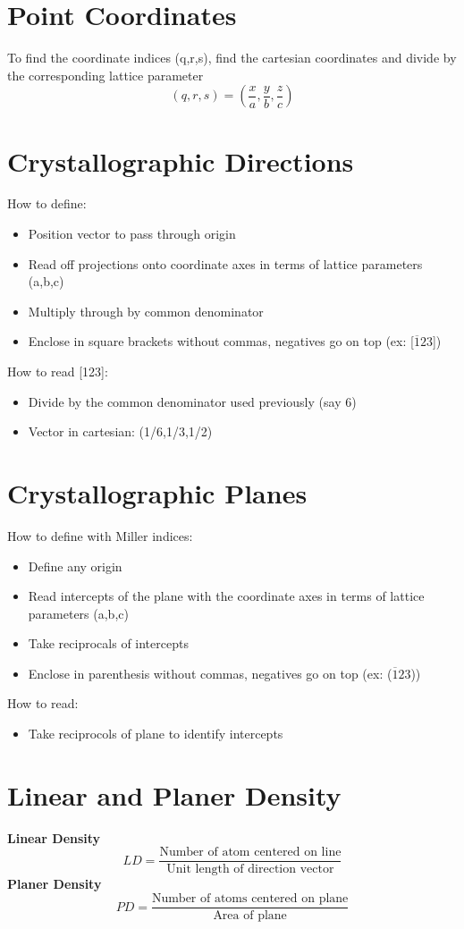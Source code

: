 \documentclass[12pt]{article}
\begin{document}
\section*{Point Coordinates}
To find the coordinate indices (q,r,s), find the cartesian coordinates and divide by the corresponding lattice parameter
\[(q,r,s) = \left( \frac{x}{a}, \frac{y}{b}, \frac{z}{c} \right)\]
\section*{Crystallographic Directions}
How to define:
\begin{itemize}
    \item Position vector to pass through origin
    \item Read off projections onto coordinate axes in terms of lattice parameters (a,b,c)
    \item Multiply through by common denominator
    \item Enclose in square brackets without commas, negatives go on top (ex: [$\overline{1} 2 3$])
\end{itemize}
How to read [123]:
\begin{itemize}
    \item Divide by the common denominator used previously (say 6)
    \item Vector in cartesian: (1/6,1/3,1/2)
\end{itemize}
\section*{Crystallographic Planes}
How to define with Miller indices:
\begin{itemize}
    \item Define any origin
    \item Read intercepts of the plane with the coordinate axes in terms of lattice parameters (a,b,c)
    \item Take reciprocals of intercepts
    \item Enclose in parenthesis without commas, negatives go on top (ex: ($\overline{1} 2 3$))
\end{itemize}
How to read:
\begin{itemize}
    \item Take reciprocols of plane to identify intercepts
\end{itemize}
\section*{Linear and Planer Density}
\textbf{Linear Density}
\[LD = \frac{\text{Number of atom centered on line}}{\text{Unit length of direction vector}}\]
\textbf{Planer Density}
\[PD=\frac{\text{Number of atoms centered on plane}}{\text{Area of plane}}\]
\newpage
\end{document}
